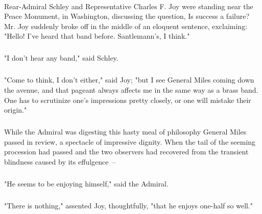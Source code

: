 \documentclass[11pt]{article}
\begin{document}
\paragraph{}   Rear-Admiral Schley and Representative Charles F. Joy were
standing near the Peace Monument, in Washington, discussing the
question, Is success a failure?  Mr. Joy suddenly broke off in the
middle of an eloquent sentence, exclaiming:  "Hello!  I've heard that
band before.  Santlemann's, I think."
\subparagraph{}   "I don't hear any band," said Schley.
\subparagraph{}  "Come to think, I don't either," said Joy; "but I see General
Miles coming down the avenue, and that pageant always affects me in
the same way as a brass band.  One has to scrutinize one's impressions
pretty closely, or one will mistake their origin."
\subparagraph{}   While the Admiral was digesting this hasty meal of philosophy
General Miles passed in review, a spectacle of impressive dignity.
When the tail of the seeming procession had passed and the two
observers had recovered from the transient blindness caused by its
effulgence~--
\subparagraph{}   "He seems to be enjoying himself," said the Admiral.
\subparagraph{}  "There is nothing," assented Joy, thoughtfully, "that he enjoys
one-half so well."
\\
\end{document}
